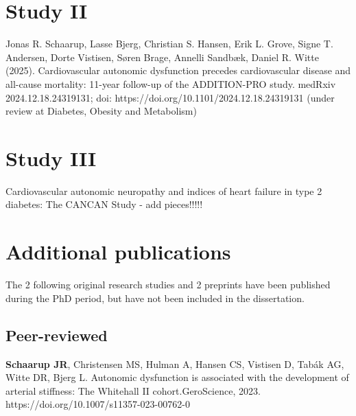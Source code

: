 \documentclass[
  a4paper,
  headsepline=true,
  open=any]{scrbook}
\begin{document}
\hypertarget{study-ii}{%
\section*{Study II}\label{study-ii}}


Jonas R. Schaarup, Lasse Bjerg, Christian S. Hansen, Erik L. Grove,
Signe T. Andersen, Dorte Vistisen, Søren Brage, Annelli Sandbæk, Daniel
R. Witte (2025). Cardiovascular autonomic dysfunction precedes
cardiovascular disease and all-cause mortality: 11-year follow-up of the
ADDITION-PRO study. medRxiv 2024.12.18.24319131; doi:
https://doi.org/10.1101/2024.12.18.24319131 (under review at Diabetes,
Obesity and Metabolism)

\hypertarget{study-iii}{%
\section*{Study III}\label{study-iii}}


Cardiovascular autonomic neuropathy and indices of heart failure in type
2 diabetes: The CANCAN Study - add pieces!!!!!

\newpage

\hypertarget{additional-publications}{%
\section*{Additional publications}\label{additional-publications}}


The 2 following original research studies and 2 preprints have been
published during the PhD period, but have not been included in the
dissertation.

\hypertarget{peer-reviewed}{%
\subsection*{Peer-reviewed}\label{peer-reviewed}}

\textbf{Schaarup JR}, Christensen MS, Hulman A, Hansen CS, Vistisen D,
Tabák AG, Witte DR, Bjerg L. Autonomic dysfunction is associated with
the development of arterial stiffness: The Whitehall II
cohort.GeroScience, 2023. https://doi.org/10.1007/s11357-023-00762-0
\end{document}
